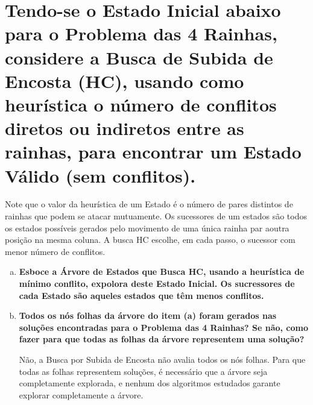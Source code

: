 \documentclass[paper=a4, fontsize=11pt]{scrartcl} %
\begin{document}
    
    \section{Tendo-se o Estado Inicial abaixo para o Problema das 4 Rainhas, considere a Busca de Subida de Encosta (HC), usando como heurística o número de conflitos diretos ou indiretos entre as rainhas, para encontrar um Estado Válido (sem conflitos).}
    
    \vspace{0.8cm}
    \par{Note que o valor da heurística de um Estado é o número de pares distintos de rainhas que podem se atacar mutuamente. Os sucessores de um estados são todos os estados possíveis gerados pelo movimento de uma única rainha par aoutra posição na mesma coluna. A busca HC escolhe, em cada passo, o sucessor com menor número de conflitos.}
    \pagebreak
    \begin{enumerate}[(a)]
        \item \textbf{Esboce a Árvore de Estados que Busca HC, usando a heurística de mínimo conflito, expolora deste Estado Inicial. Os sucressores de cada Estado são aqueles estados que têm menos conflitos.}
        \par 
        \vspace{0.2cm}

        \item \textbf{Todos os nós folhas da árvore do item (a) foram gerados nas soluções encontradas para o Problema das 4 Rainhas? Se não, como fazer para que todas as folhas da árvore representem uma solução?}
        \par Não, a Busca por Subida de Encosta não avalia todos os nós folhas. Para que todas as folhas representem soluções, é necessário que a árvore seja completamente explorada, e nenhum dos algoritmos estudados garante explorar completamente a árvore.
        \vspace{0.2cm}

    \end{enumerate}

    
\end{document}
